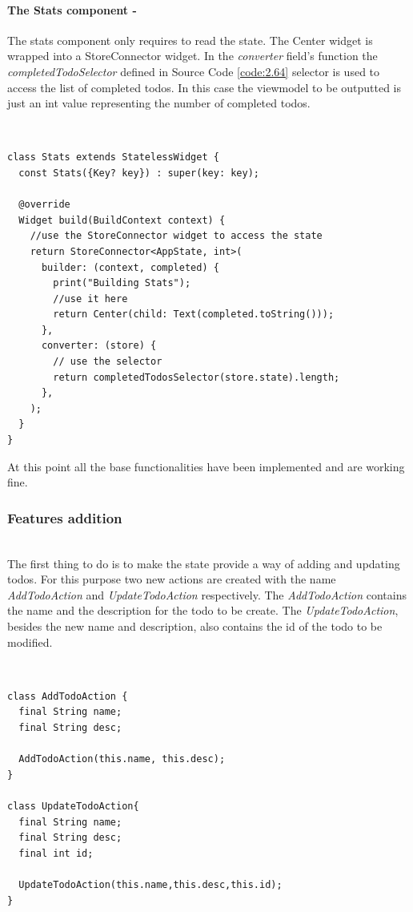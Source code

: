 \paragraph{The Stats component - }
\label{subpar:todo_app_bloc_core_state}
The stats component only requires to read the state. The Center widget is wrapped into a StoreConnector widget. In the \textit{converter} field's function the \textit{completedTodoSelector} defined in Source Code \ref{code:2.64} selector is used to access the list of completed todos. In this case the viewmodel to be outputted is just an int value representing the number of completed todos.
\begin{code}
\mbox{}\\
 \mbox{}
		\label{code:2.14}
\begin{verbatim}
class Stats extends StatelessWidget {
  const Stats({Key? key}) : super(key: key);

  @override
  Widget build(BuildContext context) {
    //use the StoreConnector widget to access the state
    return StoreConnector<AppState, int>(
      builder: (context, completed) {
        print("Building Stats");
        //use it here
        return Center(child: Text(completed.toString()));
      },
      converter: (store) {
        // use the selector
        return completedTodosSelector(store.state).length;
      },
    );
  }
}
\end{verbatim}
\mbox{}
\end{code}

At this point all the base functionalities have been implemented and are working fine.
 

\subsubsection{Features addition}  \label{par:todo_app_inherited_widget_introduction}
\hfill\\
The first thing to do is to make the state provide a way of adding and updating todos. For this purpose two new actions are created with the name \textit{AddTodoAction} and \textit{UpdateTodoAction} respectively. The \textit{AddTodoAction} contains the name and the description for the todo to be create. The \textit{UpdateTodoAction}, besides the new name and description, also contains the id of the todo to be modified.
\begin{code}
\mbox{}\\
 \mbox{}
		\label{code:2.14}
\begin{verbatim}
class AddTodoAction {
  final String name;
  final String desc;

  AddTodoAction(this.name, this.desc);
}

class UpdateTodoAction{
  final String name;
  final String desc;
  final int id;

  UpdateTodoAction(this.name,this.desc,this.id);
}
\end{verbatim}
\mbox{}
\end{code}

